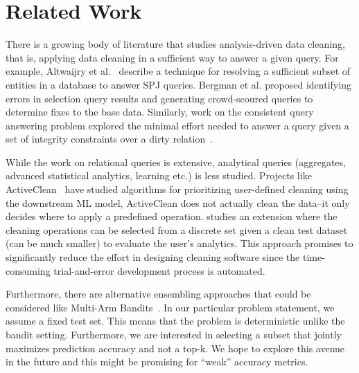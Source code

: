 \section{Related Work}
There is a growing body of literature that studies analysis-driven data cleaning, that is, applying data cleaning in a sufficient way to answer a given query.
For example, Altwaijry et al.~\cite{altwaijry2015query} describe a technique for resolving a sufficient subset of entities in a database to answer SPJ queries.
Bergman et al. \cite{DBLP:conf/sigmod/BergmanMNT15} proposed identifying errors in selection query results and generating crowd-scoured queries to determine fixes to the base data.
Similarly, work on the consistent query answering problem explored the minimal effort needed to answer a query given a set of integrity constraints over a dirty relation~\cite{DBLP:series/synthesis/2011Bertossi}.

While the work on relational queries is extensive, analytical queries (aggregates, advanced statistical analytics, learning etc.) is less studied.
Projects like ActiveClean~\cite{DBLP:journals/pvldb/KrishnanWWFG16} have studied algorithms for prioritizing user-defined cleaning using the downstream ML model, ActiveClean does not actually clean the data--it only decides where to apply a predefined operation.
\sys studies an extension where the cleaning operations can be selected from a discrete set given a clean test dataset (can be much smaller) to evaluate the user's analytics.
This approach promises to significantly reduce the effort in designing cleaning software since the time-consuming trial-and-error development process is automated.

Furthermore, there are alternative ensembling approaches that could be considered like Multi-Arm Bandits~\cite{bubeck2013multiple}. 
In our particular problem statement, we assume a fixed test set.
This means that the problem is deterministic unlike the bandit setting.
Furthermore, we are interested in selecting a subset that jointly maximizes prediction accuracy and not a top-k.
We hope to explore this avenue in the future and this might be promising for ``weak'' accuracy metrics.

